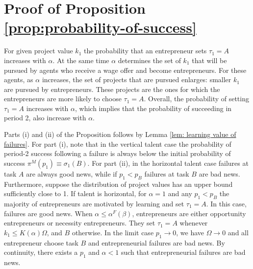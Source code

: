 \documentclass[12pt,american]{paper}
\theoremstyle{remark}
\begin{document}
\section*{Proof of Proposition \ref{prop:probability-of-success}}

 For given project value $k_1$ the probability that an entrepreneur sets $\tau_1=A$ increases with $\alpha$. At the same time $\alpha$ determines the set of $k_1$ that will be pursued by agents who receive a wage offer and become entrepreneurs.  For these agents, as $\alpha$ increases, the set of projects that are pursued enlarges: smaller $k_1$ are pursued by entrepreneurs. These projects are the ones for which the entrepreneurs are more likely to choose $\tau_1 =A$. Overall, the probability of setting $\tau_1=A$ increases with $\alpha$, which implies that the probability of succeeding in period 2, also increase with $\alpha$. 
 
 Parts (i) and (ii) of the Proposition follows by Lemma \ref{lem: learning value of failures}. For part (i), note that in the vertical talent case the probability of period-2 success following a failure is always below the initial probability of success $\pi^M(p_1)\equiv\sigma_1(B)$. For part (ii), in the horizontal talent case failures at task $A$ are always good news, while if $p_1<p_B$ failures at task $B$ are bad news.  Furthermore, suppose the distribution of project values has an upper bound sufficiently close to 1. If talent is horizontal, for $\alpha=1$ and  any $p_1<p_B$  the majority of entrepreneurs are motivated by learning and set $\tau_1=A$. In this case, failures are good news. When  $\alpha \leq \alpha^F(\beta)$, entrepreneurs are either opportunity entrepreneurs or necessity entrepreneurs. They set $\tau_1=A$ whenever $k_{1}\leq K(\alpha) \Omega $, and $B$ otherwise. In the limit case $p_1 \rightarrow 0$, we have $ \Omega \rightarrow 0$ and all entrepreneur choose task $B$ and entrepreneurial failures are bad news. By continuity, there exists a $p_1$ and $\alpha<1$ such that entrepreneurial failures are bad news.
\end{document}
